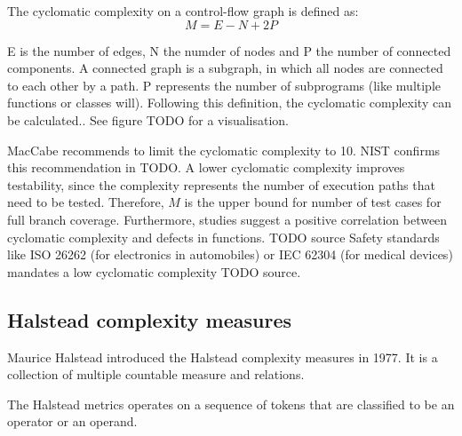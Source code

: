 The cyclomatic complexity on a control-flow graph is defined as:
\begin{displaymath}
    M = E - N + 2P
\end{displaymath}

E is the number of edges, N the numder of nodes and P the number of connected components.  A connected graph is a subgraph, in which all nodes are connected to each other by a path. P represents the number of subprograms (like multiple functions or classes will).
Following this definition, the cyclomatic complexity can be calculated.. See figure TODO for a visualisation.

MacCabe recommends to limit the cyclomatic complexity to 10. NIST confirms this recommendation in TODO. A lower cyclomatic complexity improves testability, since the complexity represents the number of execution paths that need to be tested. Therefore, $M$ is the upper bound for number of test cases for full branch coverage. 
Furthermore, studies suggest a positive correlation between cyclomatic complexity and defects in functions. TODO source
Safety standards like ISO 26262 (for electronics in automobiles) or IEC 62304 (for medical devices) mandates a low cyclomatic complexity TODO source.

\subsection{Halstead complexity measures}
Maurice Halstead introduced the Halstead complexity measures in 1977. It is a collection of multiple countable measure and relations.

The Halstead  metrics operates on a sequence of tokens that are classified to be an operator or an operand.

